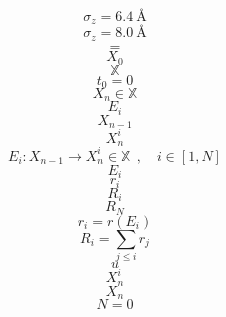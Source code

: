 \documentclass{scrreprt}
\begin{document}
\begin{equation}
\sigma_z = \SI{6.4}{\angstrom}
\end{equation}
\begin{equation}
\sigma_z = \SI{8.0}{\angstrom}
\end{equation}
\begin{equation}
\hat{=}
\end{equation}
\begin{equation}
X_0
\end{equation}
\begin{equation}
\mathbb{X}
\end{equation}
\begin{equation}
t_0 = 0
\end{equation}
\begin{equation}
X_n \in \mathbb{X}
\end{equation}
\begin{equation}
E_i
\end{equation}
\begin{equation}
X_{n-1}
\end{equation}
\begin{equation}
X_n^i
\end{equation}
\begin{equation}
  E_i : X_{n-1} \rightarrow X_n^i \in \mathbb{X} ~~,\quad i \in [1, N]
\end{equation}
\begin{equation}
E_i
\end{equation}
\begin{equation}
r_i
\end{equation}
\begin{equation}
R_i
\end{equation}
\begin{equation}
R_N
\end{equation}
\begin{equation}
  r_i = r(E_i)
\end{equation}
\begin{equation}
  R_i = \sum_{j \le i}{r_j}
\end{equation}
\begin{equation}
u
\end{equation}
\begin{equation}
X_n^i
\end{equation}
\begin{equation}
X_n
\end{equation}
\begin{equation}
N = 0
\end{equation}
\end{document}
